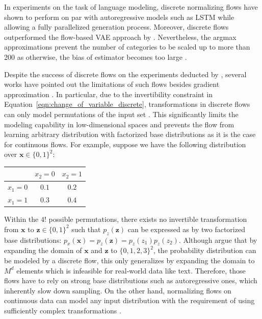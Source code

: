 In experiments on the task of language modeling, discrete normalizing flows have shown to perform on par with autoregressive models such as LSTM while allowing a fully parallelized generation process. 
Moreover, discrete flows outperformed the flow-based \ac{VAE} approach by \citet{SemiDiscreteNFSequence}. %
Nevertheless, the argmax approximations prevent the number of categories to be scaled up to more than 200 as otherwise, the bias of estimator becomes too large \cite{GumbelSoftmax1, GumbelSoftmax2}.

Despite the success of discrete flows on the experiments deducted by \citet{TranDiscreteFlows}, several works have pointed out the limitations of such flows besides gradient approximation \cite{SemiDiscreteNFSequence, NormalizingFlowsOverview2, IDF++}. 
In particular, due to the invertibility constraint in Equation~\ref{eqn:change_of_variable_discrete}, transformations in discrete flows can only model permutations of the input set \cite{SemiDiscreteNFSequence}.
This significantly limits the modeling capability in low-dimensional spaces and prevents the flow from learning arbitrary distribution with factorized base distributions as it is the case for continuous flows.
For example, suppose we have the following distribution over $\bm{x}\in\{0,1\}^{2}$:
\begin{table}[ht!]
    \centering
    \begin{tabular}{ccc}
         & $x_2=0$ & $x_2=1$ \\
         \midrule
         $x_1=0$ & $0.1$ & $0.2$ \\
         $x_1=1$ & $0.3$ & $0.4$ \\
         \bottomrule
    \end{tabular}
\end{table}

Within the $4!$ possible permutations, there exists no invertible transformation from $\bm{x}$ to $\bm{z}\in\{0,1\}^{2}$ such that $p_z(\bm{z})$ can be expressed as by two factorized base distributions: $p_x(\bm{x})=p_z(\bm{z})=p_z(z_1)p_z(z_2)$.
Although \citet{IDF++} argue that by expanding the domain of $\bm{x}$ and $\bm{z}$ to $\{0,1,2,3\}^{2}$, the probability distribution can be modeled by a discrete flow, this only generalizes by expanding the domain to $M^{d}$ elements which is infeasible for real-world data like text.
Therefore, those flows have to rely on strong base distributions such as autoregressive ones, which inherently slow down sampling.
On the other hand, normalizing flows on continuous data can model any input distribution with the requirement of using sufficiently complex transformations \cite{NormalizingFlowsOverview, NormalizingFlowsOverview2}. 


